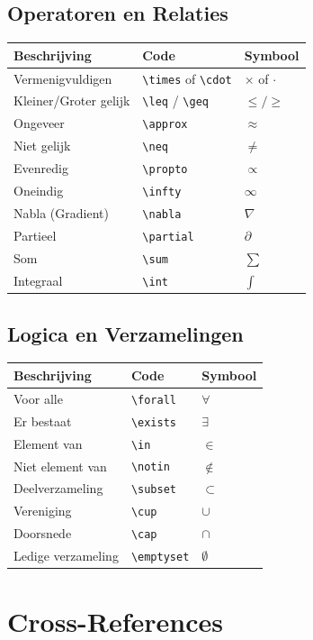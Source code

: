 \documentclass[a4paper,11pt]{article}
\begin{document}
\subsection{Operatoren en Relaties}
\begin{tabular}{lll}
\toprule
\textbf{Beschrijving} & \textbf{Code} & \textbf{Symbool} \\
\midrule
Vermenigvuldigen & \verb|\times| of \verb|\cdot| & $\times$ of $\cdot$ \\
Kleiner/Groter gelijk & \verb|\leq| / \verb|\geq| & $\leq / \geq$ \\
Ongeveer & \verb|\approx| & $\approx$ \\
Niet gelijk & \verb|\neq| & $\neq$ \\
Evenredig & \verb|\propto| & $\propto$ \\
Oneindig & \verb|\infty| & $\infty$ \\
Nabla (Gradient) & \verb|\nabla| & $\nabla$ \\
Partieel & \verb|\partial| & $\partial$ \\
Som & \verb|\sum| & $\sum$ \\
Integraal & \verb|\int| & $\int$ \\
\bottomrule
\end{tabular}

\subsection{Logica en Verzamelingen}
\begin{tabular}{lll}
\toprule
\textbf{Beschrijving} & \textbf{Code} & \textbf{Symbool} \\
\midrule
Voor alle & \verb|\forall| & $\forall$ \\
Er bestaat & \verb|\exists| & $\exists$ \\
Element van & \verb|\in| & $\in$ \\
Niet element van & \verb|\notin| & $\notin$ \\
Deelverzameling & \verb|\subset| & $\subset$ \\
Vereniging & \verb|\cup| & $\cup$ \\
Doorsnede & \verb|\cap| & $\cap$ \\
Ledige verzameling & \verb|\emptyset| & $\emptyset$ \\
\bottomrule
\end{tabular}

\section{Cross-References}
\label{sec:crossref}
\end{document}
